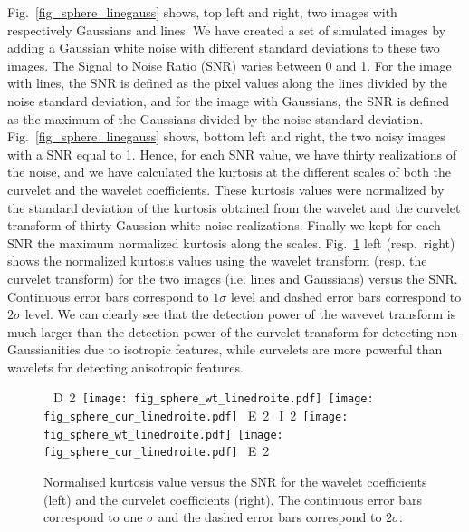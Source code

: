 Fig.~\ref{fig_sphere_linegauss} shows, top left and right, two images with respectively Gaussians and lines. We have created a set 
of simulated images by adding a Gaussian white noise with different standard deviations to these two images. The Signal to Noise 
Ratio (SNR) varies between 0 and 1. For the image with lines, the SNR is defined as the pixel values along the lines divided by the 
noise standard deviation, and  for the image with Gaussians, the SNR is defined as the maximum of the Gaussians divided by the noise 
standard deviation. Fig.~\ref{fig_sphere_linegauss} shows, bottom left and right, the two noisy images with a SNR equal to 1. Hence, 
for each SNR value, we have thirty realizations of the noise, and we have calculated the kurtosis at the different scales of both the 
curvelet and the wavelet coefficients. These kurtosis values were normalized by the standard deviation of the kurtosis obtained from 
the wavelet and the curvelet transform of thirty Gaussian white noise realizations. Finally we kept for each SNR the maximum normalized 
kurtosis along the scales. Fig.~\ref{fig_wtcur_sphere_linegauss} left (resp.~right) shows the normalized kurtosis values using the wavelet 
transform (resp. the curvelet transform) for the two images (i.e. lines and Gaussians) versus the SNR. Continuous error bars correspond 
to $1\sigma$ level and dashed error bars correspond to $2\sigma$ level. We can clearly see that the detection power of the wavevet 
transform is much larger than the detection power of the curvelet transform for detecting non-Gaussianities due to isotropic features, 
while curvelets are more powerful than wavelets for detecting anisotropic features.

\begin{figure}[htb]
\centerline{
 \hbox{
D 2
\texttt{[image: fig\_sphere\_wt\_linedroite.pdf]}
\texttt{[image: fig\_sphere\_cur\_linedroite.pdf]}
E 2
I 2
\texttt{[image: fig\_sphere\_wt\_linedroite.pdf]}%
\texttt{[image: fig\_sphere\_cur\_linedroite.pdf]}
E 2
}}
\caption{Normalised kurtosis value versus the SNR for the wavelet coefficients (left) and the curvelet coefficients (right). 
The continuous error bars correspond to one $\sigma$ and the dashed error bars correspond to $2\sigma$.}
\label{fig_wtcur_sphere_linegauss}
\end{figure}

